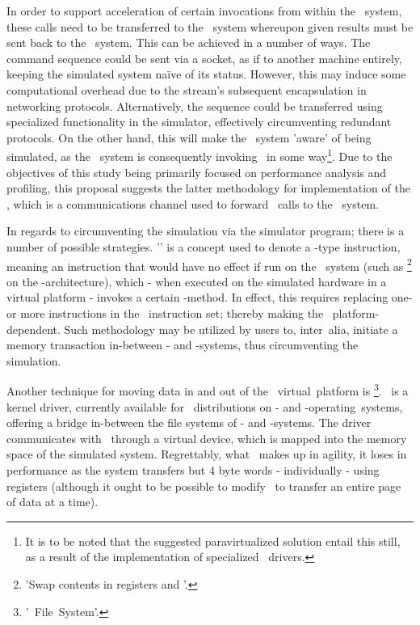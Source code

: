 In order to support acceleration of certain invocations from within the \termtarget\ system, these calls need to be transferred to the \termhost\ system whereupon given results must be sent back to the \termtarget\ system.
This can be achieved in a number of ways.
The command sequence could be sent via a socket, as if to another machine entirely, keeping the simulated system naïve of its status.
However, this may induce some computational overhead due to the stream's subsequent encapsulation in networking protocols.
Alternatively, the sequence could be transferred using specialized functionality in the simulator, effectively circumventing redundant protocols.
On the other hand, this will make the \termtarget\ system 'aware' of being simulated, as the \termtarget\ system is consequently invoking \termsimics\ in some way\footnote{It is to be noted that the suggested paravirtualized solution entail this still, as a result of the implementation of specialized \termopengles\ drivers.}.
Due to the objectives of this study being primarily focused on performance analysis and profiling, this proposal suggests the latter methodology for implementation of the \termsimicspipe , which is a communications channel used to forward \termapi\ calls to the \termhost\ system.

In regards to circumventing the simulation via the simulator program; there is a number of possible strategies.
'\termmagicinstr ' is a concept used to denote a -type instruction, meaning an instruction that would have no effect if run on the \termtarget\ system (such as \footnote{'Swap contents in registers  and '.} on the \termxeightysix -architecture), which - when executed on the simulated hardware in a virtual platform - invokes a certain \termcallback -method. In effect, this requires replacing one- or more instructions in the \termtarget\ instruction set; thereby making the \termmagicinstr\ platform-dependent.
Such methodology may be utilized by users to, inter~alia, initiate a memory transaction in-between \termtarget - and \termhost -systems, thus circumventing the simulation.

Another technique for moving data in and out of the \termsimics\ virtual~platform is \termfs \footnote{'\termsimics ~File~System'.}.
\termfs\ is a kernel driver, currently available for \termsimics\ distributions on \termlinux - and \termsolaris -operating~systems, offering a bridge in-between the file systems of \termtarget - and \termhost -systems.
The driver communicates with \termsimics\ through a virtual device, which is mapped into the memory space of the simulated system.
Regrettably, what \termfs\ makes up in agility, it loses in performance as the system transfers but $4$ byte words - individually - using registers (although it ought to be possible to modify \termfs\ to transfer an entire page of data at a time).

